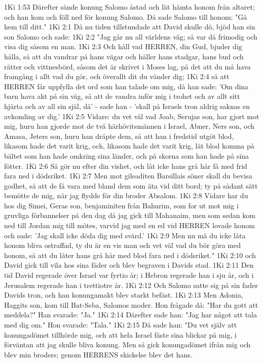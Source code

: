 1Ki 1:53  Därefter sände konung Salomo åstad och lät hämta honom från altaret; och han kom och föll ned för konung Salomo. Då sade Salomo till honom: "Gå hem till ditt."
1Ki 2:1  Då nu tiden tillstundade att David skulle dö, bjöd han sin son Salomo och sade:
1Ki 2:2  "Jag går nu all världens väg; så var då frimodig och visa dig såsom en man.
1Ki 2:3  Och håll vad HERREN, din Gud, bjuder dig hålla, så att du vandrar på hans vägar och håller hans stadgar, hans bud och rätter och vittnesbörd, såsom det är skrivet i Moses lag, på det att du må hava framgång i allt vad du gör, och överallt dit du vänder dig;
1Ki 2:4  så att HERREN får uppfylla det ord som han talade om mig, då han sade: 'Om dina barn hava akt på sin väg, så att de vandra inför mig i trohet och av allt sitt hjärta och av all sin själ, då' - sade han - 'skall på Israels tron aldrig saknas en avkomling av dig.'
1Ki 2:5  Vidare: du vet väl vad Joab, Serujas son, har gjort mot mig, huru han gjorde mot de två härhövitsmännen i Israel, Abner, Ners son, och Amasa, Jeters son, huru han dräpte dem, så att han i fredstid utgöt blod, likasom hade det varit krig, och, likasom hade det varit krig, lät blod komma på bältet som han hade omkring sina länder, och på skorna som han hade på sina fötter.
1Ki 2:6  Så gör nu efter din vishet, och låt icke hans grå hår få med frid fara ned i dödsriket.
1Ki 2:7  Men mot gileaditen Barsillais söner skall du bevisa godhet, så att de få vara med bland dem som äta vid ditt bord; ty på sådant sätt bemötte de mig, när jag flydde för din broder Absalom.
1Ki 2:8  Vidare har du hos dig Simei, Geras son, benjaminiten från Bahurim, som for ut mot mig i gruvliga förbannelser på den dag då jag gick till Mahanaim, men som sedan kom ned till Jordan mig till mötes, varvid jag med en ed vid HERREN lovade honom och sade: 'Jag skall icke döda dig med svärd.'
1Ki 2:9  Men nu må du icke låta honom bliva ostraffad, ty du är en vis man och vet väl vad du bör göra med honom, så att du låter hans grå hår med blod fara ned i dödsriket."
1Ki 2:10  och David gick till vila hos sina fäder och blev begraven i Davids stad.
1Ki 2:11  Den tid David regerade över Israel var fyrtio år; i Hebron regerade han i sju år, och i Jerusalem regerade han i trettiotre år.
1Ki 2:12  Och Salomo satte sig på sin fader Davids tron, och han konungamakt blev starkt befäst.
1Ki 2:13  Men Adonia, Haggits son, kom till Bat-Seba, Salomos moder. Hon frågade då: "Har du gott att meddela?" Han svarade: "Ja."
1Ki 2:14  Därefter sade han: "Jag har något att tala med dig om." Hon svarade: "Tala."
1Ki 2:15  Då sade han: "Du vet själv att konungadömet tillhörde mig, och att hela Israel fäste sina blickar på mig, i förväntan att jag skulle bliva konung. Men så gick konungadömet ifrån mig och blev min broders; genom HERRENS skickelse blev det hans.
